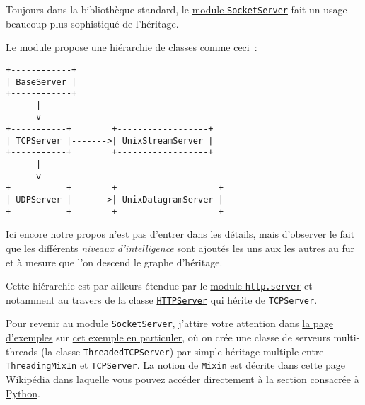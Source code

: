     Toujours dans la bibliothèque standard, le
\href{https://docs.python.org/3/library/socketserver.html}{module
\texttt{SocketServer}} fait un usage beaucoup plus sophistiqué de
l'héritage.

Le module propose une hiérarchie de classes comme ceci~:

    \begin{verbatim}
+------------+
| BaseServer |
+------------+
      |
      v
+-----------+        +------------------+
| TCPServer |------->| UnixStreamServer |
+-----------+        +------------------+
      |
      v
+-----------+        +--------------------+
| UDPServer |------->| UnixDatagramServer |
+-----------+        +--------------------+
\end{verbatim}

    Ici encore notre propos n'est pas d'entrer dans les détails, mais
d'observer le fait que les différents \emph{niveaux d'intelligence} sont
ajoutés les uns aux les autres au fur et à mesure que l'on descend le
graphe d'héritage.

Cette hiérarchie est par ailleurs étendue par le
\href{https://docs.python.org/3/library/http.server.html}{module
\texttt{http.server}} et notamment au travers de la classe
\href{https://docs.python.org/3/library/http.server.html\#http.server.HTTPServer}{\texttt{HTTPServer}}
qui hérite de \texttt{TCPServer}.

    Pour revenir au module \texttt{SocketServer}, j'attire votre attention
dans
\href{https://docs.python.org/3/library/socketserver.html\#examples}{la
page d'exemples} sur
\href{https://docs.python.org/3/library/socketserver.html\#asynchronous-mixins}{cet
exemple en particuler}, où on crée une classe de serveurs multi-threads
(la classe \texttt{ThreadedTCPServer}) par simple héritage multiple
entre \texttt{ThreadingMixIn} et \texttt{TCPServer}. La notion de
\texttt{Mixin} est \href{http://en.wikipedia.org/wiki/Mixin}{décrite
dans cette page Wikipédia} dans laquelle vous pouvez accéder directement
\href{http://en.wikipedia.org/wiki/Mixin\#In_Python}{à la section
consacrée à Python}.


    
    
    
